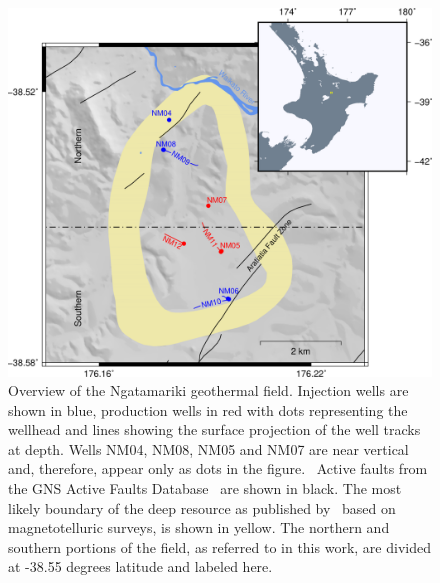 \begin{figure}[h!]
\begin{center}
\includegraphics[width=0.90\columnwidth]{Chapter_3_Nga/figures/merc_Nga_overview_temps-wells_12-15/merc_Nga_overview_wells_12-15}
\caption[Overview of the Ngatamariki geothermal field]{{
Overview of the Ngatamariki geothermal field. Injection wells are shown
in blue, production wells in red with dots representing the wellhead and
lines showing the surface projection of the well tracks at depth. Wells
NM04, NM08, NM05 and NM07 are near vertical and, therefore, appear only
as dots in the figure.~ Active faults from the GNS Active Faults
Database~\protect\citep{AFDB} are shown in black. The most likely boundary
of the deep resource as published by~\protect\cite{Boseley_2010} based on
magnetotelluric surveys, is shown in yellow. The northern and southern
portions of the field, as referred to in this work, are divided at
-38.55 degrees latitude and labeled here.
{\label{795275}}%
}}
\end{center}
\end{figure}


